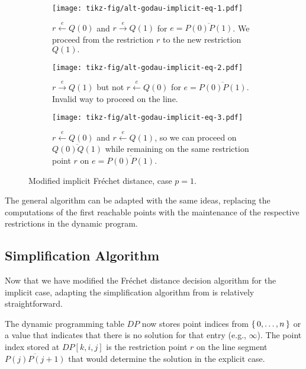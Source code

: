 \begin{figure}
    \centering
    \begin{subfigure}[t]{0.3\textwidth}
      \texttt{[image: tikz-fig/alt-godau-implicit-eq-1.pdf]}
      \caption{\(r \overset e\leftarrow Q(0)\) and \(r \overset e\rightarrow Q(1)\) for \(e = \overline{P(0)P(1)}\). We proceed from the restriction \(r\) to the new restriction \(Q(1).\)}
    \end{subfigure}
    \begin{subfigure}[t]{0.3\textwidth}
      \texttt{[image: tikz-fig/alt-godau-implicit-eq-2.pdf]}
      \caption{\(r \overset e\rightarrow Q(1)\) but not \(r \overset e\leftarrow Q(0)\) for \(e = \overline{P(0)P(1)}\). Invalid way to proceed on the line.}
    \end{subfigure}
    \begin{subfigure}[t]{0.3\textwidth}
      \texttt{[image: tikz-fig/alt-godau-implicit-eq-3.pdf]}
      \caption{\(r \overset e\leftarrow Q(0)\) and \(r \overset e\leftarrow Q(1)\), so we can proceed on \(\overline{Q(0)Q(1)}\) while remaining on the same restriction point \(r\) on \(e = \overline{P(0)P(1)}\).}
    \end{subfigure}

    \caption{Modified implicit Fréchet distance, case \(p = 1\).}
    \label{fig:alt_godau_implicit_eq}
\end{figure}

The general algorithm can be adapted with the same ideas, replacing the computations of the first reachable points with the maintenance of the respective restrictions in the dynamic program.

\subsection{Simplification Algorithm}
Now that we have modified the Fréchet distance decision algorithm for the implicit case, adapting the simplification algorithm from \citeauthor{on_optimal_polyline_simplification_using_the_hausdorff_and_frechet_distance} is relatively straightforward.

The dynamic programming table \(DP\) now stores point indices from \(\set{0, \dots, n}\) or a value that indicates that there is no solution for that entry (e.g., \(\infty\)). The point index stored at \(DP[k,i,j]\) is the restriction point \(r\) on the line segment \(\overline{P(j)P(j+1)}\) that would determine the solution in the explicit case.

